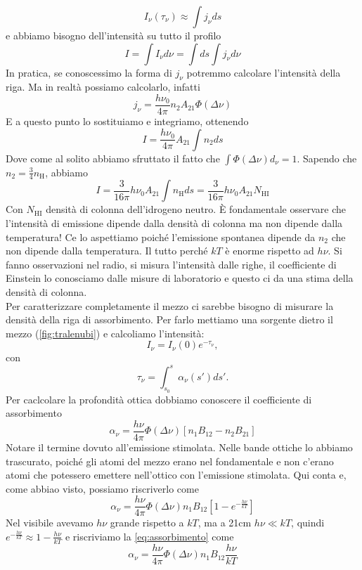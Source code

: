 \[
    I_\nu(\tau_\nu)\approx \int j_\nu ds
\]
e abbiamo bisogno dell'intensità su tutto il profilo
\[
I=\int I_\nu d\nu = \int ds \int j_\nu d\nu
\]
In pratica, se conoscessimo la forma di $j_\nu$ potremmo calcolare l'intensità della riga. Ma in realtà possiamo calcolarlo, infatti 
\[
    j_\nu = \frac{h\nu_0}{4\pi}n_2A_{21}\Phi(\Delta \nu)
\]
E a questo punto lo sostituiamo e integriamo, ottenendo
\[
    I = \frac{h\nu_0}{4\pi}A_{21}\int n_2 ds
\]
Dove come al solito abbiamo sfruttato il fatto che $\int \Phi(\Delta \nu)d_\nu = 1$. Sapendo che $n_2=\frac{3}{4}n_\text{H}$, abbiamo
\[
    I = \frac{3}{16\pi}h\nu_0A_{21}\int n_\text{H} ds = \frac{3}{16\pi}h\nu_0A_{21} N_{\text{HI}}
    \label{eq:intemi}
\]
Con $N_\text{HI}$ densità di colonna dell'idrogeno neutro. È fondamentale osservare che l'intensità di emissione dipende dalla densità di colonna ma non dipende dalla temperatura! Ce lo aspettiamo poiché l'emissione spontanea dipende da $n_2$ che non dipende dalla temperatura. Il tutto perché $kT$ è enorme rispetto ad $h\nu$. Si fanno osservazioni nel radio, si misura l'intensità dalle righe, il coefficiente di Einstein lo conosciamo dalle misure di laboratorio e questo ci da una stima della densità di colonna. \\
Per caratterizzare completamente il mezzo ci sarebbe bisogno di misurare la densità della riga di assorbimento. Per farlo mettiamo una sorgente dietro il mezzo (\ref{fig:tralenubi}) e calcoliamo l'intensità:
\[
 I_\nu = I_\nu(0)e^{-\tau_\nu},
\]
con
\begin{equation}
    \tau_\nu = \int_{s_0}^{s}\alpha_\nu(s')ds'.
    \label{eq:prottica}
\end{equation}
Per caclcolare la profondità ottica dobbiamo conoscere il coefficiente di assorbimento
\[
    \alpha_\nu= \frac{h\nu}{4\pi}\Phi(\Delta\nu)\left[ n_1B_{12}-n_2B_{21}\right]
\]
Notare il termine dovuto all'emissione stimolata. Nelle bande ottiche lo abbiamo trascurato, poiché gli atomi del mezzo erano nel fondamentale e non c'erano atomi che potessero emettere nell'ottico con l'emissione stimolata. Qui conta e, come abbiao visto, possiamo riscriverlo come
\begin{equation}
    \alpha_\nu= \frac{h\nu}{4\pi}\Phi(\Delta\nu)n_1B_{12}\left[1 -e^{-\frac{h\nu}{kT}}\right]
    \label{eq:assorbimento}
\end{equation}
Nel visibile avevamo $h\nu$ grande rispetto a $kT$, ma a 21cm $h\nu\ll kT$, quindi $e^{-\frac{h\nu}{kT}}\approx 1-\frac{h\nu}{kT}$ e riscriviamo la \ref{eq:assorbimento} come
\begin{equation}
    \alpha_\nu= \frac{h\nu}{4\pi}\Phi(\Delta\nu)n_1B_{12}\frac{h\nu}{kT}
\end{equation}
